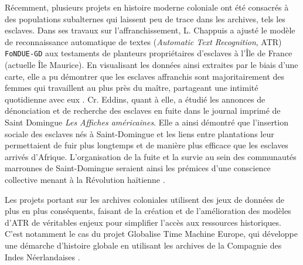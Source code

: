 \documentclass[final, fra]{anthology-ch}     %
\begin{document}
Récemment, plusieurs projets en histoire moderne coloniale ont été consacrés à des populations subalternes qui laissent peu de trace dans les archives, tels les esclaves. 
Dans ses travaux sur l’affranchissement, L. Chappuis a ajusté le modèle de reconnaissance automatique de textes (\textit{Automatic Text Recognition}, ATR) \texttt{FoNDUE-GD} \cite{vers-un-modele-diachronique-pour-les-mains-modernes-françaises} aux testaments de planteurs propriétaires d’esclaves à l’Île de France (actuelle Île Maurice). En visualisant les données ainsi extraites par le biais d'une carte, elle a pu démontrer que les esclaves affranchis sont majoritairement des femmes qui travaillent au plus près du maître, partageant une intimité quotidienne avec eux \cite{loraine-chappuis-ile-de-france}.
Cr. Eddins, quant à elle, a étudié les annonces de dénonciation et de recherche des esclaves en fuite dans le journal imprimé de Saint Domingue \textit{Les Affiches américaines}. Elle a ainsi démontré que l’insertion sociale des esclaves nés à Saint-Domingue et les liens entre plantations leur permettaient de fuir plus longtemps et de manière plus efficace que les esclaves arrivés d’Afrique. L'organisation de la fuite et la survie au sein des communautés marronnes de Saint-Domingue seraient ainsi les prémices d'une conscience collective menant à la Révolution haïtienne \cite{EddinsRunaways}. 

Les projets portant sur les archives coloniales utilisent des jeux de données de plus en plus conséquents, faisant de la création et de l’amélioration des modèles d'ATR de véritables enjeux pour simplifier l’accès aux ressources historiques. C'est notamment le cas du projet Globalise Time Machine Europe, qui développe une démarche d’histoire globale en utilisant les archives de la Compagnie des Indes Néerlandaises \cite{a-digital-infrastructure-for-the-voc-archives}.
\end{document}
